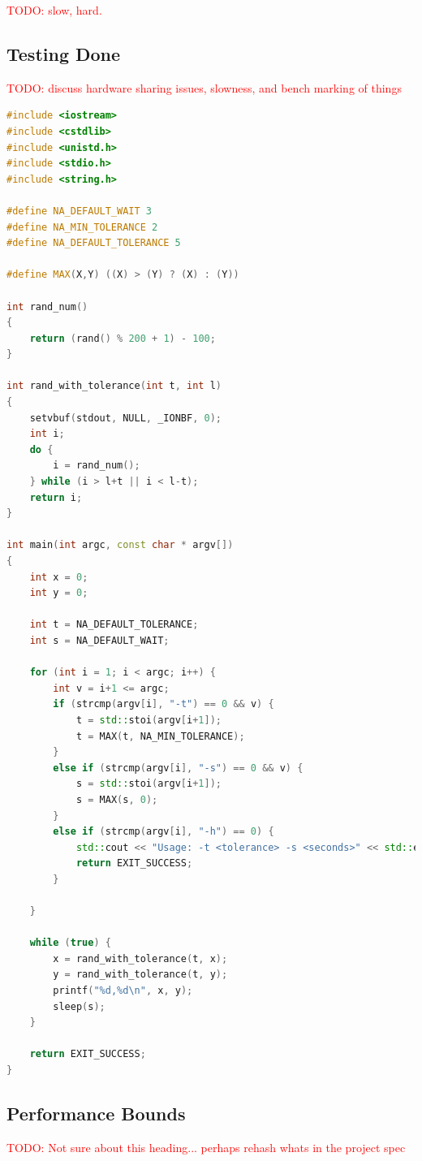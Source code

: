 \documentclass[11pt,a4paper,titlepage]{report}
\begin{document}
\textcolor{red}{TODO: slow, hard.}


\subsection{Testing Done}

\textcolor{red}{TODO: discuss hardware sharing issues, slowness, and bench marking of things}

\begin{lstlisting}[caption=rand-face-detect.cpp,language=C++]
#include <iostream>
#include <cstdlib>
#include <unistd.h>
#include <stdio.h>
#include <string.h>

#define NA_DEFAULT_WAIT 3
#define NA_MIN_TOLERANCE 2
#define NA_DEFAULT_TOLERANCE 5

#define MAX(X,Y) ((X) > (Y) ? (X) : (Y))

int rand_num()
{
    return (rand() % 200 + 1) - 100;
}

int rand_with_tolerance(int t, int l)
{
    setvbuf(stdout, NULL, _IONBF, 0);
    int i;
    do {
        i = rand_num();
    } while (i > l+t || i < l-t);
    return i;
}

int main(int argc, const char * argv[])
{
    int x = 0;
    int y = 0;

    int t = NA_DEFAULT_TOLERANCE;
    int s = NA_DEFAULT_WAIT;

    for (int i = 1; i < argc; i++) {
        int v = i+1 <= argc;
        if (strcmp(argv[i], "-t") == 0 && v) {
            t = std::stoi(argv[i+1]);
            t = MAX(t, NA_MIN_TOLERANCE);
        }
        else if (strcmp(argv[i], "-s") == 0 && v) {
            s = std::stoi(argv[i+1]);
            s = MAX(s, 0);
        }
        else if (strcmp(argv[i], "-h") == 0) {
            std::cout << "Usage: -t <tolerance> -s <seconds>" << std::endl;
            return EXIT_SUCCESS;
        }

    }

    while (true) {
        x = rand_with_tolerance(t, x);
        y = rand_with_tolerance(t, y);
        printf("%d,%d\n", x, y);
        sleep(s);
    }

    return EXIT_SUCCESS;
}
\end{lstlisting}


\subsection{Performance Bounds}

\textcolor{red}{TODO: Not sure about this heading... perhaps rehash whats in the project spec}
\end{document}
